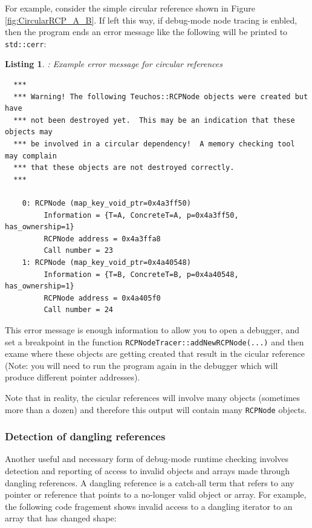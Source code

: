 \documentclass[pdf,ps2pdf,11pt]{SANDreport}
\newtheorem{listing}{Listing}
\begin{document}
For example, consider the simple circular reference shown in Figure
{}\ref{fig:CircularRCP_A_B}.  If left this way, if debug-mode node
tracing is enbled, then the program ends an error message like the
following will be printed to {}\texttt{std::cerr}:

\begin{listing}: Example error message for circular references \\
\label{listing:curcular-ref-error-msg}
{\small\begin{verbatim}
  ***
  *** Warning! The following Teuchos::RCPNode objects were created but have
  *** not been destroyed yet.  This may be an indication that these objects may
  *** be involved in a circular dependency!  A memory checking tool may complain
  *** that these objects are not destroyed correctly.
  ***
  
    0: RCPNode (map_key_void_ptr=0x4a3ff50)
         Information = {T=A, ConcreteT=A, p=0x4a3ff50, has_ownership=1}
         RCPNode address = 0x4a3ffa8
         Call number = 23
    1: RCPNode (map_key_void_ptr=0x4a40548)
         Information = {T=B, ConcreteT=B, p=0x4a40548, has_ownership=1}
         RCPNode address = 0x4a405f0
         Call number = 24
\end{verbatim}}
\end{listing}

This error message is enough information to allow you to open a
debugger, and set a breakpoint in the function
{}\texttt{RCPNodeTracer::addNewRCPNode(...)} and then exame where
these objects are getting created that result in the cicular reference
(Note: you will need to run the program again in the debugger which
will produce different pointer addresses).

Note that in reality, the cicular references will involve many objects
(sometimes more than a dozen) and therefore this output will contain
many {}\texttt{RCPNode} objects.


%
{}\subsubsection{Detection of dangling references}
\label{sec:detection-dangling-references}
%

Another useful and necessary form of debug-mode runtime checking
involves detection and reporting of access to invalid objects and
arrays made through dangling references.  A dangling reference is a
catch-all term that refers to any pointer or reference that points to
a no-longer valid object or array.  For example, the following code
fragement shows invalid access to a dangling iterator to an array that
has changed shape:
\end{document}
